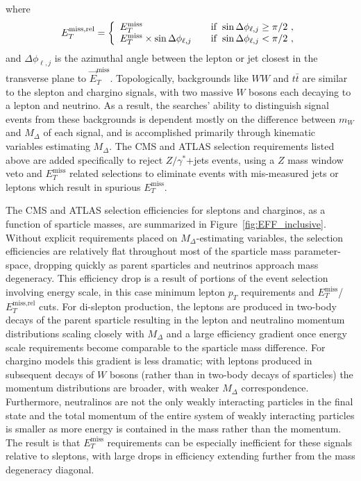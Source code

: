 where
\begin{eqnarray}      
E_{T}^\text{miss,rel} = \left\{
	\begin{array}{l l}
	E_{T}^\text{miss}  & \quad \mathrm{if}~\sin\Delta\phi_{\ell,j} \ge \pi/2~, \\
	E_{T}^\text{miss} \times \sin\Delta\phi_{\ell,j} & \quad \mathrm{if}~\sin\Delta\phi_{\ell,j} < \pi/2~,
	\end{array} \right. 
	\label{eq:function}
\end{eqnarray} 
and $\Delta\phi_{\ell,j}$ is the azimuthal angle between the lepton or jet closest in the transverse plane to $\vec{E}_{T}^\text{miss}$. Topologically, backgrounds like $WW$ and $t\bar{t}$ are similar to the slepton and chargino signals, with two massive $W$ bosons each decaying to a lepton and neutrino. As a result, the searches' ability to distinguish signal events from these backgrounds is dependent mostly on the difference between $m_{W}$ and $M_{\Delta}$ of each signal, and is accomplished primarily through kinematic variables estimating $M_{\Delta}$. The CMS and ATLAS selection requirements listed above are added specifically to reject $Z/\gamma^*$+jets events, using a $Z$ mass window veto and $E_{T}^\text{miss}$ related selections to eliminate events with mis-measured jets or leptons which result in spurious $E_{T}^\text{miss}$. 

The CMS and ATLAS selection efficiencies for sleptons and charginos, as a function of sparticle masses, are summarized in Figure~\ref{fig:EFF_inclusive}. Without explicit requirements placed on $M_{\Delta}$-estimating variables, the selection efficiencies are relatively flat throughout most of the sparticle mass parameter-space, dropping quickly as parent sparticles and neutrinos approach mass degeneracy. This efficiency drop is a result of portions of the event selection involving energy scale, in this case minimum lepton $p_{T}$ requirements and $E_{T}^\text{miss}$/$E_{T}^\text{miss,rel}$ cuts. For di-slepton production, the leptons are produced in two-body decays of the parent sparticle resulting in the lepton and neutralino momentum distributions scaling closely with $M_{\Delta}$ and a large efficiency gradient once energy scale requirements become comparable to the sparticle mass difference. For chargino models this gradient is less dramatic; with leptons produced in subsequent decays of $W$ bosons (rather than in two-body decays of sparticles) the momentum distributions are broader, with weaker $M_{\Delta}$ correspondence. Furthermore, neutralinos are not the only weakly interacting particles in the final state and the total momentum of the entire system of weakly interacting particles is smaller as more energy is contained in the mass rather than the momentum. The result is that $E_{T}^\text{miss}$ requirements can be especially inefficient for these signals relative to sleptons, with large drops in efficiency extending further from the mass degeneracy diagonal.

